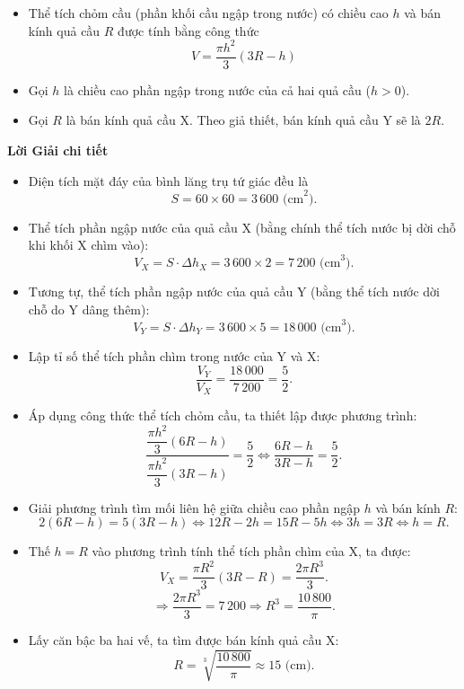 \begin{ex}
{		\begin{itemize}
			\item Thể tích chỏm cầu (phần khối cầu ngập trong nước) có chiều cao $h$ và bán kính quả cầu $R$ được tính bằng công thức
			\[ \boxed{V = \dfrac{\pi h^2}{3}(3R - h)} \]
			\item Gọi $h$ là chiều cao phần ngập trong nước của cả hai quả cầu ($h > 0$).
			\item Gọi $R$ là bán kính quả cầu X. Theo giả thiết, bán kính quả cầu Y sẽ là $2R$.
		\end{itemize}
		\textbf{Lời Giải chi tiết}
		\begin{itemize}
			\item Diện tích mặt đáy của bình lăng trụ tứ giác đều là
			\[ S = 60 \times 60 = 3\,600 \text{ (cm}^2).\]
			\item Thể tích phần ngập nước của quả cầu X (bằng chính thể tích nước bị dời chỗ khi khối X chìm vào):
			\[ V_X = S \cdot \Delta h_X = 3\,600 \times 2 = 7\,200 \text{ (cm}^3).\]
			\item Tương tự, thể tích phần ngập nước của quả cầu Y (bằng thể tích nước dời chỗ do Y dâng thêm):
			\[ V_Y = S \cdot \Delta h_Y = 3\,600 \times 5 = 18\,000 \text{ (cm}^3).\]
			\item Lập tỉ số thể tích phần chìm trong nước của Y và X:
			\[ \dfrac{V_Y}{V_X} = \dfrac{18\,000}{7\,200} = \dfrac{5}{2}.\]
			\item Áp dụng công thức thể tích chỏm cầu, ta thiết lập được phương trình:
			\[ \dfrac{\dfrac{\pi h^2}{3}(6R - h)}{\dfrac{\pi h^2}{3}(3R - h)} = \dfrac{5}{2} \Leftrightarrow \dfrac{6R - h}{3R - h} = \dfrac{5}{2}.\]
			\item Giải phương trình tìm mối liên hệ giữa chiều cao phần ngập $h$ và bán kính $R$:
			\[ 2(6R - h) = 5(3R - h) \Leftrightarrow 12R - 2h = 15R - 5h \Leftrightarrow 3h = 3R \Leftrightarrow h = R.\]
			\item Thế $h = R$ vào phương trình tính thể tích phần chìm của X, ta được:
			\[ V_X = \dfrac{\pi R^2}{3}(3R - R) = \dfrac{2\pi R^3}{3}.\]
			\[ \Rightarrow \dfrac{2\pi R^3}{3} = 7\,200 \Rightarrow R^3 = \dfrac{10\,800}{\pi}.\]
			\item Lấy căn bậc ba hai vế, ta tìm được bán kính quả cầu X:
			\[ R = \sqrt[3]{\dfrac{10\,800}{\pi}} \approx 15 \text{ (cm)}.\]
		\end{itemize}
	}
\end{ex}

